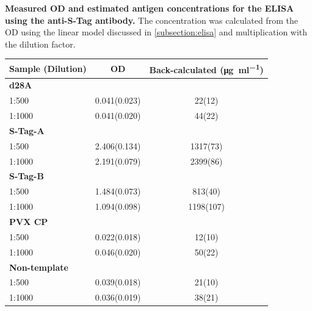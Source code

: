 \begin{supptable}[ht]
    \centering
    \caption{\textbf{Measured OD and estimated antigen concentrations for the ELISA using the anti-S-Tag antibody.} The concentration was calculated from the OD using the linear model discussed in \autoref{subsection:elisa} and multiplication with the dilution factor. }
    \label{tab:sample_values_elisa_anti_s_tag}
    \begin{tabular}{
        l
        S[table-format=1.3(2),uncertainty-mode=separate]
        S[table-format=4.0(2),uncertainty-mode=separate]
    }
    \toprule
    {\textbf{Sample (Dilution)}} &
    {\textbf{OD}} &
    {\textbf{Back-calculated (\si{\micro\gram\per\milli\litre})}} \\
    \midrule
    \textbf{d28A} \\
    1:500 & 0.041(0.023) & 22(12) \\
    1:1000 & 0.041(0.020) & 44(22) \\
    \textbf{S-Tag-A} \\
    1:500 & 2.406(0.134) & 1317(73) \\
    1:1000 & 2.191(0.079) & 2399(86) \\
    \textbf{S-Tag-B} \\
    1:500 & 1.484(0.073) & 813(40) \\
    1:1000 & 1.094(0.098) & 1198(107) \\
    \textbf{PVX CP} \\
    1:500 & 0.022(0.018) & 12(10) \\
    1:1000 & 0.046(0.020) & 50(22) \\
    \textbf{Non-template} \\
    1:500 & 0.039(0.018) & 21(10) \\
    1:1000 & 0.036(0.019) & 38(21) \\
    \bottomrule
    \end{tabular}
\end{supptable}

